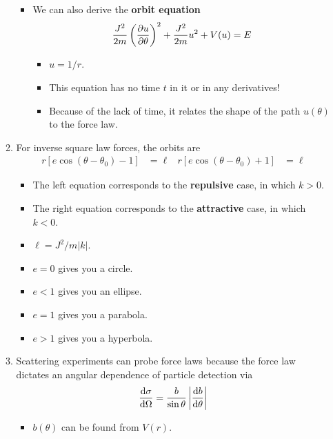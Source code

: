 \documentclass[../notes.tex]{subfiles}
\begin{document}
\begin{itemize}
\begin{enumerate}
\begin{itemize}
\begin{itemize}
            \end{itemize}
            \item We can also derive the \textbf{orbit equation}
            \begin{equation*}
                \frac{J^2}{2m}\left( \pdv{u}{\theta} \right)^2+\frac{J^2}{2m}u^2+V(u) = E
            \end{equation*}
            \begin{itemize}
                \item $u=1/r$.
                \item This equation has no time $t$ in it or in any derivatives!
                \item Because of the lack of time, it relates the shape of the path $u(\theta)$ to the force law.
            \end{itemize}
        \end{itemize}
        \item For inverse square law forces, the orbits are
        \begin{align*}
            r[e\cos(\theta-\theta_0)-1] &= \ell&
            r[e\cos(\theta-\theta_0)+1] &= \ell
        \end{align*}
        \begin{itemize}
            \item The left equation corresponds to the \textbf{repulsive} case, in which $k>0$.
            \item The right equation corresponds to the \textbf{attractive} case, in which $k<0$.
            \item $\ell=J^2/m|k|$.
            \item $e=0$ gives you a circle.
            \item $e<1$ gives you an ellipse.
            \item $e=1$ gives you a parabola.
            \item $e>1$ gives you a hyperbola.
        \end{itemize}
        \item Scattering experiments can probe force laws because the force law dictates an angular dependence of particle detection via
        \begin{equation*}
            \dv{\sigma}{\Omega} = \frac{b}{\sin\theta}\left| \dv{b}{\theta} \right|
        \end{equation*}
        \begin{itemize}
            \item $b(\theta)$ can be found from $V(r)$.

\end{itemize}
\end{enumerate}
\end{itemize}
\end{document}
